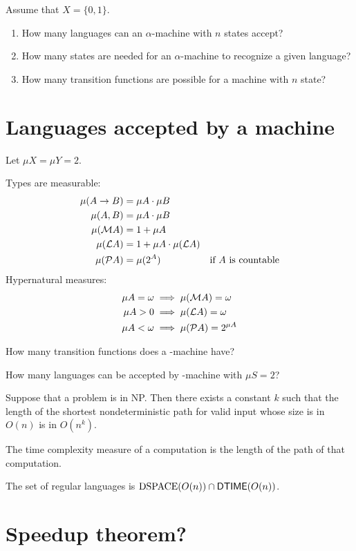Assume that $X = \{0,1\}$.
\begin{enumerate}
    \item How many languages can an $\alpha$-machine with $n$ states accept?
    \item How many states are needed for an $\alpha$-machine to recognize a given language?
    \item How many transition functions are possible for a machine with $n$ state?
\end{enumerate}

\section{Languages accepted by a machine}

Let $\mu X = \mu Y = 2$.

Types are measurable:
\begin{align}
    \mu(A\to B) &= \mu A \cdot \mu B
    \\ \mu(A,B) &= \mu A \cdot \mu B
    \\ \mu(\mathcal M A) &= 1 + \mu A
    \\ \mu(\mathcal L A) &= 1 + \mu A \cdot \mu(\mathcal L A)
    \\ \mu(\mathcal P A) &= \mu(2^A) & \text{if $A$ is countable}
\end{align}
Hypernatural measures:
\begin{align}
    \mu A = \omega &\implies \mu(\mathcal M A) = \omega
    \\ \mu A > 0 &\implies \mu(\mathcal L A) = \omega
    \\ \mu A < \omega &\implies \mu(\mathcal P A) = 2^{\mu A}
\end{align}

How many transition functions does a \mM-machine have?

How many languages can be accepted by \mM-machine with $\mu S = 2$?

Suppose that a problem is in NP.
Then there exists a constant $k$ such that
the length of the shortest nondeterministic path
for valid input whose size is in $O(n)$ is in $O(n^k)$.

The time complexity measure of a computation is
the length of the path of that computation.

The set of regular languages is $\operatorname{DSPACE}(O(n)) \cap \operatorname{\mathsf{DTIME}}(O(n))$.

\section{Speedup theorem?}

